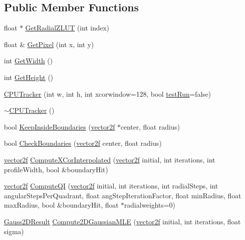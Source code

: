 \subsection*{Public Member Functions}
\begin{DoxyCompactItemize}
\item 
float $\ast$ \hyperlink{class_c_p_u_tracker_a8a8ca2636eca91688ff90d68d04ad69d}{Get\+Radial\+Z\+L\+UT} (int index)
\item 
float \& \hyperlink{class_c_p_u_tracker_afd0e07572adc7f6f70e5e130ff01402b}{Get\+Pixel} (int x, int y)
\item 
int \hyperlink{class_c_p_u_tracker_a1f380a0c3d1826e7ef6f7299ce9e5999}{Get\+Width} ()
\item 
int \hyperlink{class_c_p_u_tracker_a6da03daaee4bcdfdf8439f3adbc36aa7}{Get\+Height} ()
\item 
\hyperlink{class_c_p_u_tracker_a1efdc9c713bc19ea67b5ab1e2a82588f}{C\+P\+U\+Tracker} (int w, int h, int xcorwindow=128, bool \hyperlink{class_c_p_u_tracker_a5dd04ccf64ee6885b2dc272553c29644}{test\+Run}=false)
\item 
\hyperlink{class_c_p_u_tracker_adfd0dc510c6791891d247362ab751dd7}{$\sim$\+C\+P\+U\+Tracker} ()
\item 
bool \hyperlink{class_c_p_u_tracker_a5dd95e6830eb86a06e5302e04e411c1a}{Keep\+Inside\+Boundaries} (\hyperlink{std__incl_8h_aba974726076ec2d63a67114c536d123e}{vector2f} $\ast$center, float radius)
\item 
bool \hyperlink{class_c_p_u_tracker_a7d853e9c7142eefcbd227f18c05b60e7}{Check\+Boundaries} (\hyperlink{std__incl_8h_aba974726076ec2d63a67114c536d123e}{vector2f} center, float radius)
\item 
\hyperlink{std__incl_8h_aba974726076ec2d63a67114c536d123e}{vector2f} \hyperlink{class_c_p_u_tracker_aeb547c7da30e1621b2869634182c0900}{Compute\+X\+Cor\+Interpolated} (\hyperlink{std__incl_8h_aba974726076ec2d63a67114c536d123e}{vector2f} initial, int iterations, int profile\+Width, bool \&boundary\+Hit)
\item 
\hyperlink{std__incl_8h_aba974726076ec2d63a67114c536d123e}{vector2f} \hyperlink{class_c_p_u_tracker_ab856aa12313a07c083f2e193180fd5b6}{Compute\+QI} (\hyperlink{std__incl_8h_aba974726076ec2d63a67114c536d123e}{vector2f} initial, int iterations, int radial\+Steps, int angular\+Steps\+Per\+Quadrant, float ang\+Step\+Iteration\+Factor, float min\+Radius, float max\+Radius, bool \&boundary\+Hit, float $\ast$radialweights=0)
\item 
\hyperlink{struct_c_p_u_tracker_1_1_gauss2_d_result}{Gauss2\+D\+Result} \hyperlink{class_c_p_u_tracker_a99567e8137e89ff9ee084558e9f26344}{Compute2\+D\+Gaussian\+M\+LE} (\hyperlink{std__incl_8h_aba974726076ec2d63a67114c536d123e}{vector2f} initial, int iterations, float sigma)

\end{DoxyCompactItemize}
